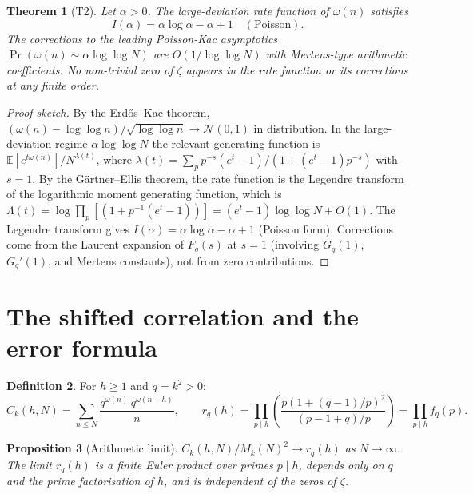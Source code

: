 \documentclass[11pt]{amsart}
\newtheorem{theorem}{Theorem}[section]
\newtheorem{proposition}[theorem]{Proposition}
\theoremstyle{definition}
\newtheorem{definition}[theorem]{Definition}
\theoremstyle{remark}
\newcommand{\om}{\omega}
\begin{document}
\begin{theorem}[T2]\label{thm:LD}
  Let $\alpha>0$.  The large-deviation rate function of $\om(n)$ satisfies
  \[
    I(\alpha) = \alpha\log\alpha - \alpha + 1 \quad(\text{Poisson}).
  \]
  The corrections to the leading Poisson-Kac asymptotics
  $\Pr(\om(n)\sim\alpha\log\log N)$ are $O(1/\log\log N)$ with Mertens-type
  arithmetic coefficients.  No non-trivial zero of $\zeta$ appears in the rate
  function or its corrections at any finite order.
\end{theorem}
\begin{proof}[Proof sketch]
  By the Erd\H{o}s--Kac theorem, $(\om(n)-\log\log n)/\sqrt{\log\log n}\to\mathcal{N}(0,1)$
  in distribution.  In the large-deviation regime $\alpha\log\log N$ the relevant
  generating function is $\mathbb{E}[e^{t\om(n)}]/N^{\lambda(t)}$, where
  $\lambda(t) = \sum_p p^{-s}(e^t-1)/(1+(e^t-1)p^{-s})$ with $s=1$.
  By the G\"artner--Ellis theorem, the rate function is the Legendre transform of the
  logarithmic moment generating function, which is
  $\Lambda(t) = \log\prod_p[(1+p^{-1}(e^t-1))] = (e^t-1)\log\log N + O(1)$.
  The Legendre transform gives $I(\alpha)=\alpha\log\alpha-\alpha+1$ (Poisson form).
  Corrections come from the Laurent expansion of $F_q(s)$ at $s=1$ (involving
  $G_q(1)$, $G_q'(1)$, and Mertens constants), not from zero contributions.
\end{proof}

\section{The shifted correlation and the error formula}
\label{sec:error}

\begin{definition}
  For $h\ge 1$ and $q=k^2>0$:
  \[
    C_k(h,N) = \sum_{n\le N}\frac{q^{\om(n)}\,q^{\om(n+h)}}{n},\qquad
    r_q(h) = \prod_{p\mid h}\!\!\left(\frac{p(1+(q-1)/p)^2}{(p-1+q)/p}\right)
    = \prod_{p\mid h}f_q(p).
  \]
\end{definition}

\begin{proposition}[Arithmetic limit]\label{prop:limit}
  $C_k(h,N)/M_k(N)^2 \to r_q(h)$ as $N\to\infty$.
  The limit $r_q(h)$ is a finite Euler product over primes $p\mid h$, depends only on
  $q$ and the prime factorisation of $h$, and is independent of the zeros of $\zeta$.
\end{proposition}
\end{document}
